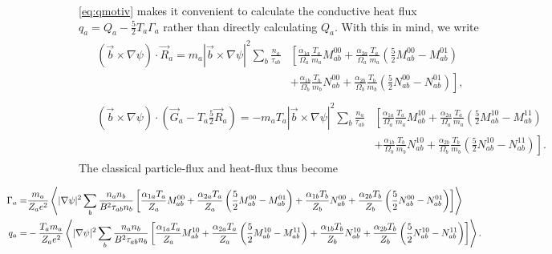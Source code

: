 \documentclass[12pt, a4paper]{article}
\newcommand{\lang}{\left\langle}
\newcommand{\rang}{\right\rangle}
\begin{document}
\autoref{eq:qmotiv} makes it convenient to calculate the conductive heat flux $q_a = Q_a - \frac{5}{2} T_a \Gamma_a$ rather than directly calculating $Q_a$. With this in mind, we write
\begin{align}
      &\begin{aligned}
        (\vec{b} \times \nabla \psi) \cdot \vec{R}_a = m_a  |\vec{b} \times \nabla \psi|^2\sum_b \frac{n_a}{\tau_{ab}}&\left[ \frac{\alpha_{1a}}{\Omega_a}  \frac{T_a}{m_a}M_{ab}^{00} + \frac{\alpha_{2a}}{\Omega_a}\frac{T_a}{m_a} \left(\frac{5}{2}M_{ab}^{00} - M_{ab}^{01}\right)  \right.\\
          &\left.+ \frac{\alpha_{1b}}{\Omega_b}\frac{T_b}{m_b}N_{ab}^{00}+ \frac{\alpha_{2b}}{\Omega_b}\frac{T_b}{m_b}\left(\frac{5}{2} N_{ab}^{00} - N_{ab}^{01}\right)\right],
      \end{aligned}\\
      &\begin{aligned}
        (\vec{b} \times \nabla \psi) \cdot \left(\vec{G}_a - T_a \frac{5}{2}\vec{R}_a\right) = -m_a T_a |\vec{b} \times \nabla \psi|^2 \sum_b \frac{n_a}{\tau_{ab}} &\left[ \frac{\alpha_{1a} }{\Omega_a} \frac{T_a}{m_a}M_{ab}^{10}
          + \frac{\alpha_{2a}}{\Omega_a}\frac{T_a}{m_a}\left(\frac{5}{2}M_{ab}^{10} - M_{ab}^{11}\right) 
        \right.\\
        &\left.+ \frac{\alpha_{1b}}{\Omega_b}\frac{T_b}{m_b} N_{ab}^{10}
          + \frac{\alpha_{2b}}{\Omega_b}\frac{T_b}{m_b}\left(\frac{5}{2}N_{ab}^{10} - N_{ab}^{11}\right) 
        \right].
      \end{aligned}
\end{align}
The classical particle-flux and heat-flux thus become

\begin{align}
  \hspace*{-18ex}\Gamma_a =&  \frac{m_a}{Z_a  e^2}\lang |\nabla \psi|^2 \sum_b \frac{n_a n_b}{B^2 \tau_{ab} n_b}\left[ \frac{\alpha_{1a} T_a}{Z_a}  M_{ab}^{00} + \frac{\alpha_{2a} T_a}{Z_a} \left(\frac{5}{2}M_{ab}^{00} - M_{ab}^{01}\right) + \frac{\alpha_{1b} T_b}{Z_b}N_{ab}^{00}+ \frac{\alpha_{2b} T_b}{Z_b}\left(\frac{5}{2} N_{ab}^{00} - N_{ab}^{01}\right)\right] \rang \\
  \hspace*{-18ex}q_a =&  -\frac{T_a m_a}{Z_a e^2}\lang |\nabla \psi|^2 \sum_b \frac{n_a n_b}{B^2 \tau_{ab} n_b }\left[ \frac{\alpha_{1a} T_a}{Z_a}  M_{ab}^{10} + \frac{\alpha_{2a} T_a}{Z_a} \left(\frac{5}{2}M_{ab}^{10} - M_{ab}^{11}\right) + \frac{\alpha_{1b} T_b}{Z_b}N_{ab}^{10}+ \frac{\alpha_{2b} T_b}{Z_b}\left(\frac{5}{2} N_{ab}^{10} - N_{ab}^{11}\right)\right] \rang.
\end{align}
\end{document}
